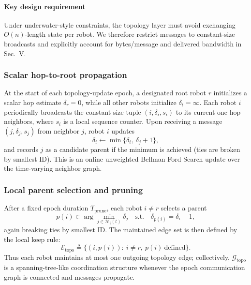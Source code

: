 \documentclass[conference]{IEEEconf}
\theoremstyle{plain}
\begin{document}
\paragraph{Key design requirement}
Under underwater-style constraints, the topology layer must avoid exchanging $O(n)$-length state per robot. We therefore restrict messages to constant-size broadcasts and explicitly account for bytes/message and delivered bandwidth in Sec.~V.

\subsubsection{Scalar hop-to-root propagation}
At the start of each topology-update epoch, a designated root robot $r$ initializes a scalar hop estimate $\delta_r=0$, while all other robots initialize $\delta_i=\infty$. Each robot $i$ periodically broadcasts the constant-size tuple $(i,\delta_i,s_i)$ to its current one-hop neighbors, where $s_i$ is a local sequence counter. Upon receiving a message $(j,\delta_j,s_j)$ from neighbor $j$, robot $i$ updates
\begin{equation}
\delta_i \leftarrow \min\{\delta_i,\ \delta_j+1\},
\label{eq:delta_update}
\end{equation}
and records $j$ as a candidate parent if the minimum is achieved (ties are broken by smallest ID). This is an online unweighted Bellman Ford Search update over the time-varying neighbor graph.

\subsubsection{Local parent selection and pruning}
After a fixed epoch duration $T_{\mathrm{prune}}$, each robot $i\neq r$ selects a parent
\begin{equation}
p(i) \in \arg\min_{j\in \mathcal{N}_i(t)} \delta_j \quad \text{s.t.}\quad \delta_{p(i)}=\delta_i-1,
\label{eq:parent}
\end{equation}
again breaking ties by smallest ID. The maintained edge set is then defined by the local keep rule:
\begin{equation}
\mathcal{E}_{\mathrm{topo}} \triangleq \{(i,p(i)):\ i\neq r,\ p(i)\ \text{defined}\}.
\label{eq:kept_edges}
\end{equation}
Thus each robot maintains at most one outgoing topology edge; collectively, $\mathcal{G}_{\mathrm{topo}}$ is a spanning-tree-like coordination structure whenever the epoch communication graph is connected and messages propagate.
\end{document}

